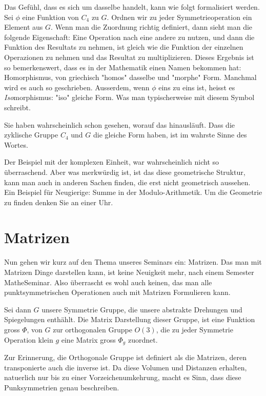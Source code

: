 \documentclass[a4paper]{article}
\newcommand{\scene}[1]{\par\noindent[ #1 ]\par}
\begin{document}
\scene{Morphismen}
Das Gefühl, dass es sich um dasselbe handelt, kann wie folgt formalisiert
werden.  Sei \(\phi\) eine Funktion von \(C_4\) zu \(G\). Ordnen wir zu jeder
Symmetrieoperation ein Element aus \(G\). Wenn man die Zuordnung richtig
definiert, dann sieht man die folgende Eigenschaft: Eine Operation nach eine
andere zu nutzen, und dann die Funktion des Resultats zu nehmen, ist gleich wie
die Funktion der einzelnen Operazionen zu nehmen und das Resultat zu
multiplizieren. Dieses Ergebnis ist so bemerkenswert, dass es in der Mathematik
einen Namen bekommen hat: Homorphismus, von griechisch "homos" dasselbe und
"morphe" Form.  Manchmal wird es auch so geschrieben. Ausserdem, wenn \(\phi\)
eins zu eins ist, heisst es \emph{Iso}morphismus: "iso" gleiche Form. Was
man typischerweise mit diesem Symbol schreibt.

\scene{Animation}
Sie haben wahrscheinlich schon gesehen, worauf das hinausläuft. Dass die
zyklische Gruppe \(C_4\) und \(G\) die gleiche Form haben, ist im wahrste Sinne
des Wortes. %

\scene{Modulo}
Der Beispiel mit der komplexen Einheit, war wahrscheinlich nicht so
\"uberraschend. Aber was merkw\"urdig ist, ist das diese geometrische Struktur,
kann man auch in anderen Sachen finden, die erst nicht geometrisch aussehen.
Ein Beispiel für Neugierige: Summe in der Modulo-Arithmetik. Um die Geometrie
zu finden denken Sie an einer Uhr.

\section{Matrizen}
\scene{Titelseite}
Nun gehen wir kurz auf den Thema unseres Seminars ein: Matrizen.  Das man mit
Matrizen Dinge darstellen kann, ist keine Neuigkeit mehr, nach einem
Semester MatheSeminar.  Also überrascht es wohl auch keinen, das man alle
punktsymmetrischen Operationen auch mit Matrizen Formulieren kann.

\scene{Matrizen}

Sei dann \(G\) unsere Symmetrie Gruppe, die unsere abstrakte Drehungen und
Spiegelungen enth\"ahlt. Die Matrix Darstellung dieser Gruppe, ist eine
Funktion gross \(\Phi\), von \(G\) zur orthogonalen Gruppe \(O(3)\), die zu
jeder Symmetrie Operation klein \(g\) eine Matrix gross \(\Phi_g\) zuordnet.

Zur Erinnerung, die Orthogonale Gruppe ist definiert als die Matrizen, deren
transponierte auch die inverse ist. Da diese Volumen und Distanzen erhalten,
natuerlich nur bis zu einer Vorzeichenumkehrung, macht es Sinn, dass diese
Punksymmetrien genau beschreiben.
\end{document}
